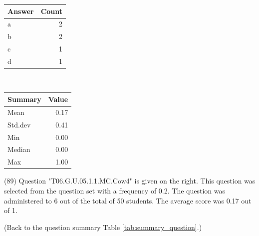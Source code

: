 \documentclass[12pt,english,nohyper]{tufte-handout}\usepackage[]{graphicx}\usepackage[]{color}
\begin{document}
\begin{center}%
\begin{tabular}{lr}
  \hline
Answer & Count \\ 
  \hline
a &   2 \\ 
  b &   2 \\ 
  c &   1 \\ 
  d &   1 \\ 
   \hline
\end{tabular}
~~~~~~~~%
\begin{tabular}{lr}
  \hline
Summary & Value \\ 
  \hline
Mean & 0.17 \\ 
  Std.dev & 0.41 \\ 
  Min & 0.00 \\ 
  Median & 0.00 \\ 
  Max & 1.00 \\ 
   \hline
\end{tabular}
\end{center}\newpage{} (89) Question "T06.G.U.05.1.1.MC.Cow4" is given on the right. This question was selected from the question set with a frequency of 0.2. The question was administered to 6 out of the total of 50 students. The average score was 0.17 out of 1.

 (Back to the question summary Table \ref{tab:summary_question}.)
\end{document}
